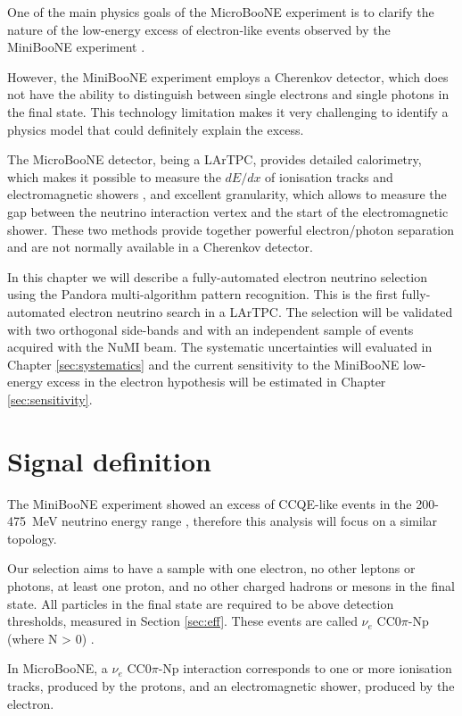 One of the main physics goals of the MicroBooNE experiment is to clarify the nature of the low-energy excess of electron-like events observed by the MiniBooNE experiment \cite{Aguilar-Arevalo:2018gpe}. 

However, the MiniBooNE experiment employs a Cherenkov detector, which does not have the ability to distinguish between single electrons and single photons in the final state. This technology limitation makes it very challenging to identify a physics model that could definitely explain the excess.

The MicroBooNE detector, being a LArTPC, provides detailed  calorimetry, which makes it possible to measure the $dE/dx$ of ionisation tracks and electromagnetic showers \cite{Acciarri:2016sli}, and excellent granularity, which allows to measure the gap between the neutrino interaction vertex and the start of the electromagnetic shower. These two methods provide together powerful electron/photon separation and are not normally available in a Cherenkov detector. 

In this chapter we will describe a fully-automated electron neutrino selection using the Pandora multi-algorithm pattern recognition. This is the first fully-automated electron neutrino search in a LArTPC. The selection will be validated with two orthogonal side-bands and with an independent sample of events acquired with the NuMI beam. The systematic uncertainties will evaluated in Chapter \ref{sec:systematics} and the current sensitivity to the MiniBooNE low-energy excess in the electron hypothesis will be estimated in Chapter \ref{sec:sensitivity}.

\section{Signal definition}
The MiniBooNE experiment showed an excess of CCQE-like events in the 200-475~MeV neutrino energy range \cite{Aguilar-Arevalo:2018gpe}, therefore this analysis will focus on a similar topology.

Our selection aims to have a sample with one electron, no other leptons or photons, at least one proton, and no other charged hadrons or mesons in the final state. All particles in the final state are required to be above detection thresholds, measured in Section \ref{sec:eff}. These events are called $\nu_{e}$ CC0$\pi$-Np (where N > 0) \cite{Katori:2013nca}. 

In MicroBooNE, a $\nu_{e}$ CC0$\pi$-Np interaction corresponds to one or more ionisation tracks, produced by the protons, and an electromagnetic shower, produced by the electron. 

